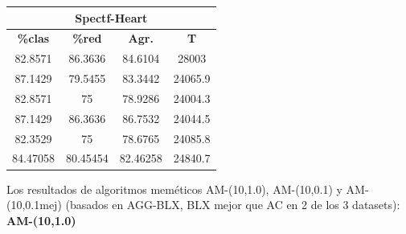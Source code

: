 \documentclass[11pt,a4paper]{article}
\theoremstyle{definition}
\begin{document}
\begin{tabbing}
{		\begin{tabular}{|c|c|c|c|}
			\hline
			\multicolumn{4}{|c|}{\textbf{Spectf-Heart}} \\ \hline
			\textbf{\%clas} & \textbf{\%red} & \textbf{Agr.} & \textbf{T} \\ \hline 
			82.8571 & 86.3636 & 84.6104 & 28003\\ \hline
87.1429 & 79.5455 & 83.3442 & 24065.9\\ \hline
82.8571 & 75 & 78.9286 & 24004.3\\ \hline
87.1429 & 86.3636 & 86.7532 & 24044.5\\ \hline
82.3529 & 75 & 78.6765 & 24085.8\\ \hline
84.47058 & 80.45454 & 82.46258 & 24840.7\\ \hline
		\end{tabular}
		}
	\end{tabbing}
	
	Los resultados de algoritmos meméticos AM-(10,1.0), AM-(10,0.1) y AM-(10,0.1mej) (basados en AGG-BLX, BLX mejor que AC en 2 de los 3 datasets): ~\\
	
	\textbf{AM-(10,1.0)}	
	
\end{document}
